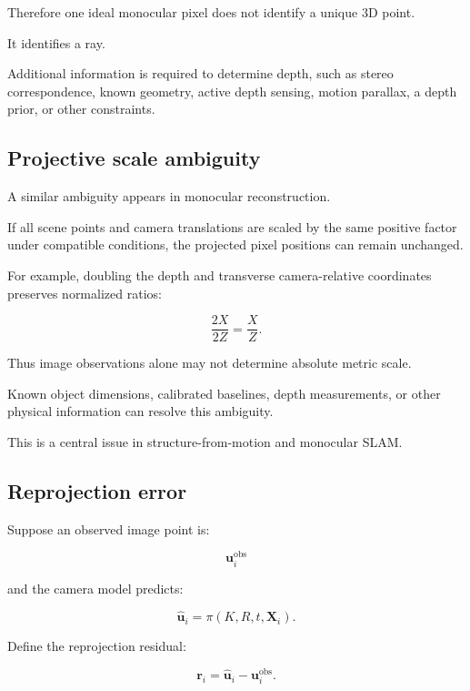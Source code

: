 Therefore one ideal monocular pixel does not identify a unique 3D point.

It identifies a ray.

Additional information is required to determine depth, such as stereo correspondence, known geometry, active depth sensing, motion parallax, a depth prior, or other constraints.

\subsection{Projective scale ambiguity}\label{02-foundations-ii-ch035-projective-scale-ambiguity}

\hypertarget{02-foundations-ii-ch035-projective-scale-ambiguity}{}

A similar ambiguity appears in monocular reconstruction.

If all scene points and camera translations are scaled by the same positive factor under compatible conditions, the projected pixel positions can remain unchanged.

For example, doubling the depth and transverse camera-relative coordinates preserves normalized ratios:

\[
 \frac{2X}{2Z}=\frac XZ.
\]

Thus image observations alone may not determine absolute metric scale.

Known object dimensions, calibrated baselines, depth measurements, or other physical information can resolve this ambiguity.

This is a central issue in structure-from-motion and monocular SLAM.

\subsection{Reprojection error}\label{02-foundations-ii-ch035-reprojection-error}

\hypertarget{02-foundations-ii-ch035-reprojection-error}{}

Suppose an observed image point is:

\[
 \mathbf u_i^{\mathrm{obs}}
\]

and the camera model predicts:

\[
 \hat{\mathbf u}_i= \pi(K,R,t,\mathbf X_i).
\]

Define the reprojection residual:

\[
 \boxed{ \mathbf r_i= \hat{\mathbf u}_i-\mathbf u_i^{\mathrm{obs}} }.
\]

